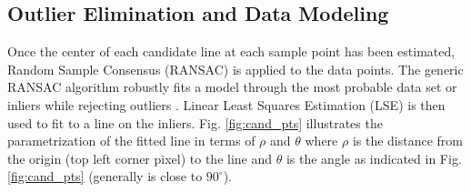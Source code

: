 \documentclass{article}
\begin{document}
\subsection{Outlier Elimination and Data Modeling}
Once the center of each candidate line at each sample point has been estimated, Random Sample Consensus (RANSAC) is applied to the data points. The generic RANSAC algorithm robustly fits a model through the most probable data set or inliers while rejecting outliers \cite{hartley_multiple_2004,fischler_random_1981}. Linear Least Squares Estimation (LSE) is then used to fit to a line on the inliers. Fig. \ref{fig:cand_pts} illustrates the parametrization of the fitted line in terms of $\rho$ and $\theta$ where $\rho$ is the distance from the origin (top left corner pixel) to the line and $\theta$ is the angle as indicated in Fig. \ref{fig:cand_pts} (generally is close to $90^\circ$).
\end{document}
